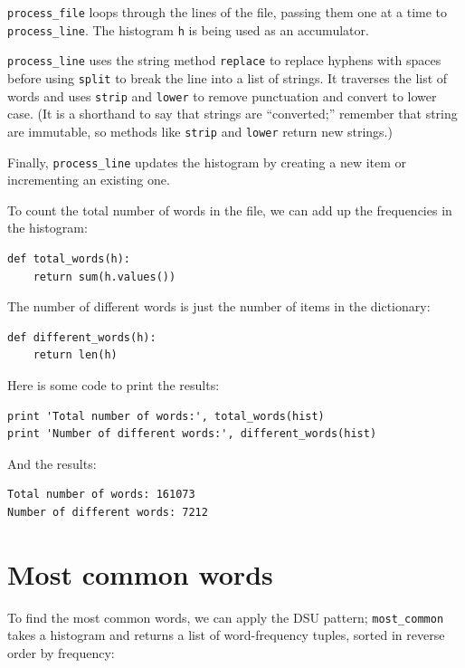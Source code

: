 \documentclass[10pt]{book}
\begin{document}

\verb"process_file" loops through the lines of the file,
passing them one at a time to \verb"process_line".  The histogram
{\tt h} is being used as an accumulator.


\verb"process_line" uses the string method {\tt replace} to replace
hyphens with spaces before using {\tt split} to break the line into a
list of strings.  It traverses the list of words and uses {\tt strip}
and {\tt lower} to remove punctuation and convert to lower case.  (It
is a shorthand to say that strings are ``converted;'' remember that
string are immutable, so methods like {\tt strip} and {\tt lower}
return new strings.)

Finally, \verb"process_line" updates the histogram by creating a new
item or incrementing an existing one.


To count the total number of words in the file, we can add up
the frequencies in the histogram:

\beforeverb
\begin{verbatim}
def total_words(h):
    return sum(h.values())
\end{verbatim}
\afterverb
%
The number of different words is just the number of items in
the dictionary:

\beforeverb
\begin{verbatim}
def different_words(h):
    return len(h)
\end{verbatim}
\afterverb
%
Here is some code to print the results:

\beforeverb
\begin{verbatim}
print 'Total number of words:', total_words(hist)
print 'Number of different words:', different_words(hist)
\end{verbatim}
\afterverb
%
And the results:

\beforeverb
\begin{verbatim}
Total number of words: 161073
Number of different words: 7212
\end{verbatim}
\afterverb
%

\section{Most common words}


To find the most common words, we can apply the DSU pattern;
\verb"most_common" takes a histogram and returns a list of
word-frequency tuples, sorted in reverse order by frequency:
\end{document}
